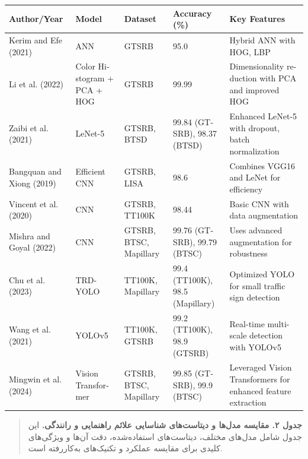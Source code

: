 \begin{latin}
\centering
\renewcommand{\arraystretch}{1} %
\tiny %
\begin{longtable}{|p{2cm}|p{1.5cm}|p{2cm}|p{2cm}|p{4cm}|} %
\hline
\textbf{Author/Year} & \textbf{Model} & \textbf{Dataset} & \textbf{Accuracy (\%)} & \textbf{Key Features} \\ 
\hline
Kerim and Efe (2021) & ANN & GTSRB & 95.0 & Hybrid ANN with HOG, LBP \\ 
\hline
Li et al. (2022) & Color Histogram + PCA + HOG & GTSRB & 99.99 & Dimensionality reduction with PCA and improved HOG \\ 
\hline
Zaibi et al. (2021) & LeNet-5 & GTSRB, BTSD & 99.84 (GTSRB), 98.37 (BTSD) & Enhanced LeNet-5 with dropout, batch normalization \\ 
\hline
Bangquan and Xiong (2019) & Efficient CNN & GTSRB, LISA & 98.6 & Combines VGG16 and LeNet for efficiency \\ 
\hline
Vincent et al. (2020) & CNN & GTSRB, TT100K & 98.44 & Basic CNN with data augmentation \\ 
\hline
Mishra and Goyal (2022) & CNN & GTSRB, BTSC, Mapillary & 99.76 (GTSRB), 99.79 (BTSC) & Uses advanced augmentation for robustness \\ 
\hline
Chu et al. (2023) & TRD-YOLO & TT100K, Mapillary & 99.4 (TT100K), 98.5 (Mapillary) & Optimized YOLO for small traffic sign detection \\ 
\hline
Wang et al. (2021) & YOLOv5 & TT100K, GTSRB & 99.2 (TT100K), 98.9 (GTSRB) & Real-time multi-scale detection with YOLOv5 \\ 
\hline
Mingwin et al. (2024) & Vision Transformer & GTSRB, BTSC, Mapillary & 99.85 (GTSRB), 99.9 (BTSC) & Leveraged Vision Transformers for enhanced feature extraction \\ 
\hline
\end{longtable}
\end{latin}



\begin{quote}
    \textbf{جدول ۲. مقایسه مدل‌ها و دیتاست‌های شناسایی علائم راهنمایی و رانندگی.} 
    این جدول شامل مدل‌های مختلف، دیتاست‌های استفاده‌شده، دقت آن‌ها و ویژگی‌های کلیدی برای مقایسه عملکرد و تکنیک‌های به‌کاررفته است.
\end{quote}









